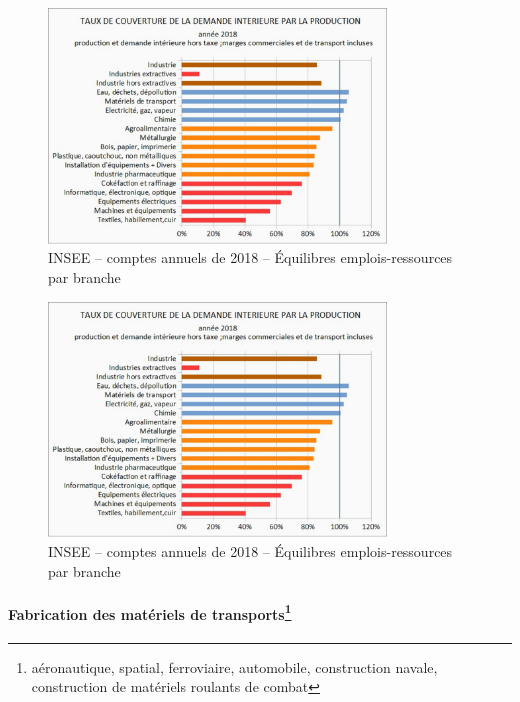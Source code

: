 \documentclass[a4paper]{article}
\begin{document}
\begin{figure}[H]
    \centering
    \includegraphics*[width=0.8\textwidth]{images/couverture}
    \caption{INSEE – comptes annuels de 2018 – Équilibres emplois-ressources par branche}
    \label{fig:couverture}
\end{figure}


\begin{figure}[H]
    \centering
    \includegraphics*[width=0.8\textwidth]{images/couverture}
    \caption{INSEE – comptes annuels de 2018 – Équilibres emplois-ressources par branche}
    \label{fig:couverture}
\end{figure}

\paragraph{Fabrication des matériels de transports\protect\footnote{aéronautique, spatial, ferroviaire, automobile, construction navale, construction de matériels roulants de combat}}
\end{document}
